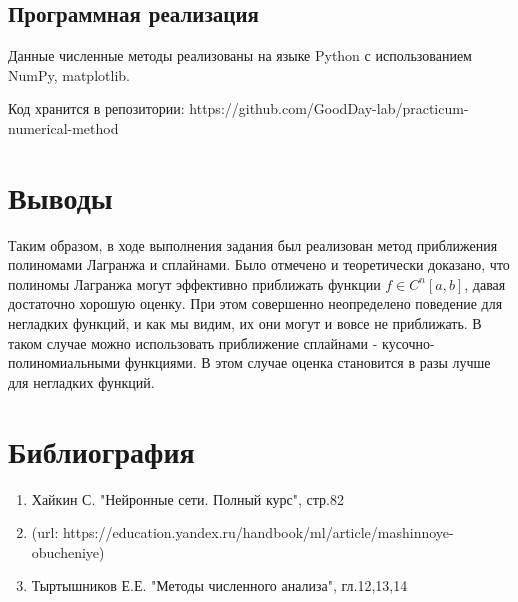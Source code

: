 \documentclass{article}
\begin{document}
\subsection{Программная реализация}
Данные численные методы реализованы на языке Python с использованием NumPy, matplotlib.

Код хранится в репозитории: 
https://github.com/GoodDay-lab/practicum-numerical-method

\section{Выводы}
Таким образом, в ходе выполнения задания был реализован метод приближения полиномами Лагранжа и сплайнами. Было отмечено и теоретически доказано, что полиномы Лагранжа могут эффективно приближать функции \(f \in C^n[a,b]\), давая достаточно хорошую оценку. При этом совершенно неопределено поведение для негладких функций, и как мы видим, их они могут и вовсе не приближать. В таком случае можно использовать приближение сплайнами - кусочно-полиномиальными функциями. В этом случае оценка становится в разы лучше для негладких функций.


\section{Библиография}
\begin{enumerate}
    \item Хайкин С. "Нейронные сети. Полный курс", стр.82
    \item (url: https://education.yandex.ru/handbook/ml/article/mashinnoye-obucheniye)
    \item Тыртышников Е.Е. "Методы численного анализа", гл.12,13,14
\end{enumerate}
\end{document}
